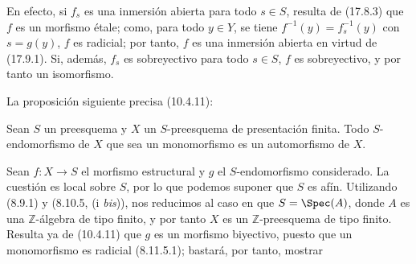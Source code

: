 En efecto, si $f_s$ es una inmersión abierta para todo $s\in S$, resulta de (17.8.3) que $f$ es un morfismo étale; como, para todo $y\in Y$, se tiene $f^{-1}(y)=f_s^{-1}(y)$ con $s=g(y)$, $f$ es radicial; por tanto, $f$ es una inmersión abierta en virtud de (17.9.1). Si, además, $f_s$ es sobreyectivo para todo $s\in S$, $f$ es sobreyectivo, y por tanto un isomorfismo.

La proposición siguiente precisa (10.4.11):

\begin{proposition}[17.9.6]
\label{IV.17.9.6}
Sean $S$ un preesquema y $X$ un $S$-preesquema de presentación finita. Todo $S$-endomorfismo de $X$ que sea un monomorfismo es un automorfismo de $X$.
\end{proposition}

Sean $f:X\to S$ el morfismo estructural y $g$ el $S$-endomorfismo considerado. La cuestión es local sobre $S$, por lo que podemos suponer que $S$ es afín. Utilizando (8.9.1) y (8.10.5, (i \emph{bis})), nos reducimos al caso en que $S=\Spec(A)$, donde $A$ es una $\mathbb{Z}$-álgebra de tipo finito, y por tanto $X$ es un $\mathbb{Z}$-preesquema de tipo finito. Resulta ya de (10.4.11) que $g$ es un morfismo biyectivo, puesto que un monomorfismo es radicial (8.11.5.1); bastará, por tanto, mostrar


